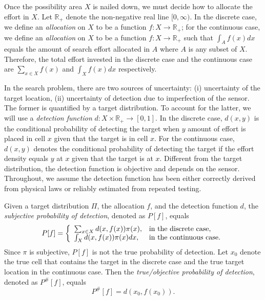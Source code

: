 \documentclass[12pt]{article}
\theoremstyle{plain}
\theoremstyle{definition}
\theoremstyle{remark}
\begin{document}
Once the possibility area $X$ is nailed down, we must decide how to allocate the effort in $X$.  Let $\mathbb{R}_+$ denote the non-negative real line $[0, \infty)$.   In the discrete case,  we define an \emph{allocation} on $X$ to be a function $f: X\rightarrow \mathbb{R}_+$; for the continuous case,  we define an \emph{allocation} on $X$ to be a function $f: X\rightarrow \mathbb{R}_+$ such that $\int_Af(x)dx$ equals the amount of search effort allocated in $A$ where $A$ is any subset of $X$. Therefore, the total effort invested in the discrete case and the continuous case are $\sum_{x\in X}f(x)$ and $\int_Xf(x)dx$ respectively. 

In the search problem, there are two sources of uncertainty: (i) uncertainty of the target location, (ii) uncertainty of detection due to imperfection of the sensor.  The former is quantified by a target distribution.  To account for the latter, we will use a \emph{detection function} $d: X\times \mathbb{R}_+\rightarrow [0, 1]$. In the discrete case, $d(x, y)$ is the conditional probability of detecting the target when $y$ amount of effort is placed in cell $x$ given that the target is in cell $x$.  For the continuous case,   $d(x, y)$ denotes the conditional probability of detecting the target if the effort density equals $y$ at $x$ given that the target is at $x$.  Different from the target distribution, the detection function is objective and depends on the sensor.  Throughout, we assume the detection function has been either correctly derived from physical laws or reliably estimated from repeated testing.  

Given a target distribution $\Pi$,  the allocation $f$, and the detection function $d$,  the \emph{subjective probability of detection},  denoted as $P[f]$, equals
\[
P[f]=\left\{
		                           \begin{array}{ll}
		                           \sum_{x\in X}d(x, f(x))\pi(x),& \hbox{in the discrete case,} \\
					\int_Xd(x, f(x))\pi(x)dx, & \hbox{in the continuous case.} 
		                          \end{array}
		                         \right.
\]
Since $\pi$ is subjective,  $P[f]$ is not the true probability of detection.  Let $x_0$ denote the true cell that contains the target  in the discrete case and the true target location in the continuous case. Then
the \emph{true/objective probability of detection},  denoted as $P^{\#} [f]$, equals
\begin{equation}
\label{eq:trueprob}
P^{\#}[f]=d(x_0, f(x_0)).
\end{equation}
\end{document}

